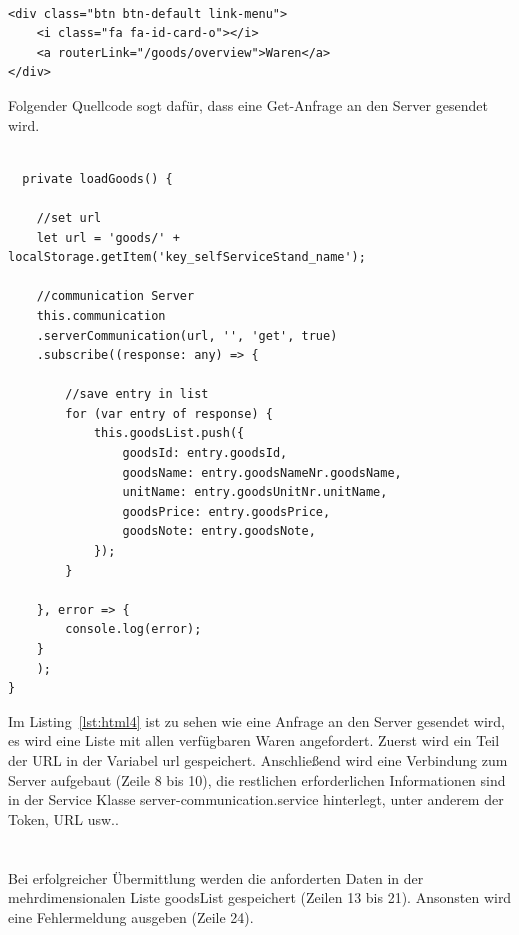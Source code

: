 \lstset{language=java}
\begin{lstlisting}[frame=tb, caption={Festlegung der internen Routen in Angular}, label={lst:html3}]

<div class="btn btn-default link-menu">
	<i class="fa fa-id-card-o"></i> 
	<a routerLink="/goods/overview">Waren</a>
</div>
	\end{lstlisting}

Folgender Quellcode sogt dafür, dass eine Get-Anfrage an den Server gesendet wird.

\lstset{language=java}
\begin{lstlisting}[frame=tb, caption={Get-Anfrage an den Server}, label={lst:html4}]
	
  private loadGoods() {
	
	//set url
	let url = 'goods/' + localStorage.getItem('key_selfServiceStand_name');
	
	//communication Server
	this.communication
	.serverCommunication(url, '', 'get', true)
	.subscribe((response: any) => {
		
		//save entry in list
		for (var entry of response) {
			this.goodsList.push({
				goodsId: entry.goodsId,
				goodsName: entry.goodsNameNr.goodsName,
				unitName: entry.goodsUnitNr.unitName,
				goodsPrice: entry.goodsPrice,
				goodsNote: entry.goodsNote,
			});
		}
		
	}, error => {
		console.log(error);
	}
	);
}
\end{lstlisting}

Im Listing~\ref{lst:html4} ist zu sehen wie eine Anfrage an den Server gesendet wird, es wird eine Liste mit allen verfügbaren Waren angefordert. Zuerst wird ein Teil der URL in der Variabel url gespeichert. Anschließend wird eine Verbindung zum Server aufgebaut (Zeile 8 bis 10), die restlichen erforderlichen Informationen sind in der Service Klasse server-communication.service hinterlegt, unter anderem der Token, URL usw.. 
\\
\\
\\
Bei erfolgreicher Übermittlung werden die anforderten Daten in der mehrdimensionalen Liste goodsList gespeichert (Zeilen 13 bis 21). Ansonsten wird eine Fehlermeldung ausgeben (Zeile 24). 